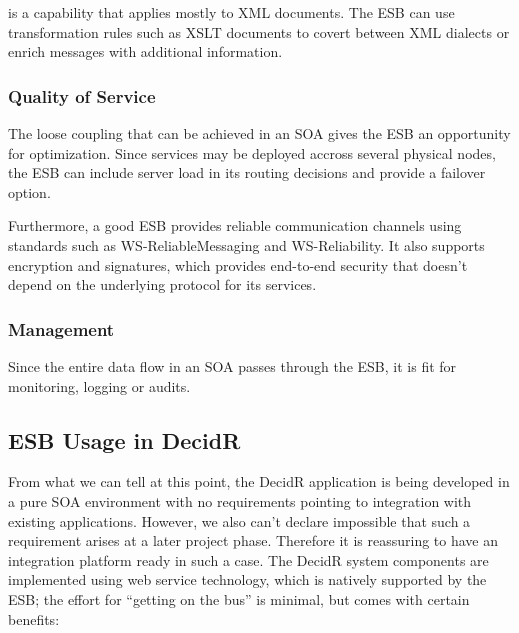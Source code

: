 is a capability that applies mostly to XML documents. The
ESB can use transformation rules such as XSLT documents to covert between XML
dialects or enrich messages with additional information.


\subsubsection{Quality of Service}
\label{subsec:quality-of-service}

The loose coupling that can be achieved in an SOA gives the ESB an opportunity
for optimization. Since services may be deployed accross several physical nodes,
the ESB can include server load in its routing decisions and provide a failover
option.

Furthermore, a good ESB provides reliable communication channels using standards
such as WS-ReliableMessaging and WS-Reliability. It also supports encryption and
signatures, which provides end-to-end security that doesn't depend on the
underlying protocol for its services.

\subsubsection{Management}
\label{subsec:management}

Since the entire data flow in an SOA passes through the ESB, it is
fit for monitoring, logging or audits.

\subsection{ESB Usage in DecidR}
\label{subsec:esb-usage-in-decidr}

From what we can tell at this point, the DecidR application is being developed
in a pure SOA environment with no requirements pointing to integration with
existing applications. However, we also can't declare impossible that such a
requirement arises at a later project phase. Therefore it is reassuring
to have an integration platform ready in such a case.
The DecidR system components are implemented using web service technology,
which is natively supported by the ESB; the effort for ``getting on the
bus'' is minimal, but comes with certain benefits:

